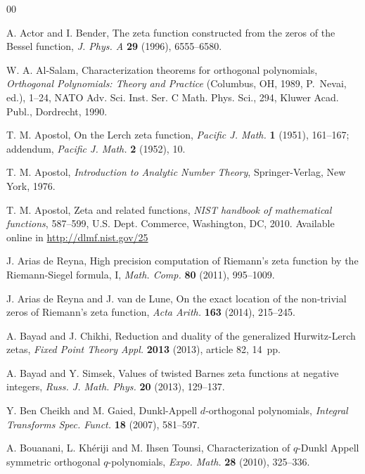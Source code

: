 \documentclass[a4paper]{amsart}
\theoremstyle{plain}
\theoremstyle{definition}
\theoremstyle{remark}
\numberwithin{equation}{section}
\begin{document}
\begin{thebibliography}{00}

A. Actor and I. Bender,
The zeta function constructed from the zeros of the Bessel function,
\textit{J. Phys. A} \textbf{29} (1996), 6555--6580.

W. A. Al-Salam,
Characterization theorems for orthogonal polynomials,
\textit{Orthogonal Polynomials: Theory and Practice}
(Columbus, OH, 1989, P.~Nevai, ed.), 1--24,
NATO Adv. Sci. Inst. Ser. C Math. Phys. Sci., 294,
Kluwer Acad. Publ., Dordrecht, 1990.

T. M. Apostol,
On the Lerch zeta function,
\textit{Pacific J. Math.} \textbf{1} (1951), 161--167;
addendum, \textit{Pacific J. Math.} \textbf{2} (1952), 10.

T. M. Apostol,
\textit{Introduction to Analytic Number Theory},
Springer-Verlag, New York, 1976.

T. M. Apostol,
Zeta and related functions,
\textit{NIST handbook of mathematical functions},
587--599, %
U.S. Dept. Commerce, Washington, DC, 2010.
Available online in \url{http://dlmf.nist.gov/25}

J. Arias de Reyna,
High precision computation of Riemann's zeta function by the Riemann-Siegel formula, I,
\textit{Math. Comp.} \textbf{80} (2011), 995--1009. 

J. Arias de Reyna and J. van de Lune, 
On the exact location of the non-trivial zeros of Riemann's zeta function,
\textit{Acta Arith.} \textbf{163} (2014), 215--245.

A. Bayad and J. Chikhi,
Reduction and duality of the generalized Hurwitz-Lerch zetas,
\textit{Fixed Point Theory Appl.} \textbf{2013} (2013), article 82, 14~pp.

A. Bayad and Y. Simsek,
Values of twisted Barnes zeta functions at negative integers,
\textit{Russ. J. Math. Phys.} \textbf{20} (2013), 129--137.

Y. Ben Cheikh and M. Gaied,
Dunkl-Appell $d$-orthogonal polynomials,
\textit{Integral Transforms Spec. Funct.}
\textbf{18} (2007), 581--597.

A. Bouanani, L. Kh\'eriji and M. Ihsen Tounsi,
Characterization of $q$-Dunkl Appell symmetric orthogonal $q$-polynomials,
\textit{Expo. Math.}
\textbf{28} (2010), 325--336.


\end{thebibliography}
\end{document}
